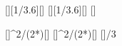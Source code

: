 [\kmph][1/3.6][\mps]
[\kmph][1/3.6][\mps]
[\mpss]

[]{\vX^2/(2*\gX)}[\meter]
[]{\vbX^2/(2*\gX)}[\meter]
[]{\hbX/3}
